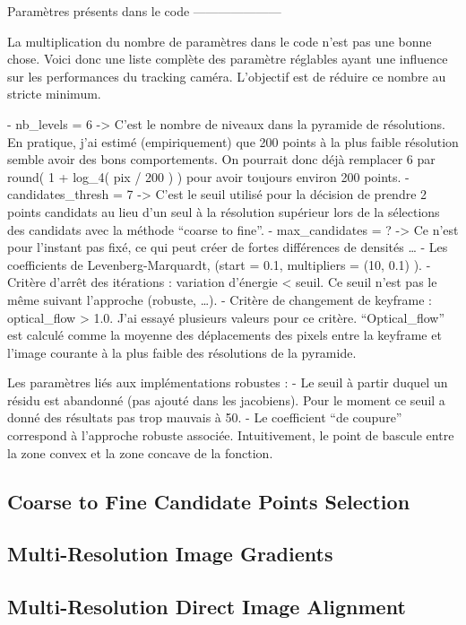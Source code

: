 Paramètres présents dans le code
---------------------

La multiplication du nombre de paramètres dans le code n’est pas une bonne chose. Voici donc une liste complète des paramètre réglables ayant une influence sur les performances du tracking caméra. L’objectif est de réduire ce nombre au stricte minimum.

- nb\_levels = 6 -> C’est le nombre de niveaux dans la pyramide de résolutions. En pratique, j’ai estimé (empiriquement) que 200 points à la plus faible résolution semble avoir des bons comportements. On pourrait donc déjà remplacer 6 par round( 1 + log\_4( pix / 200 ) ) pour avoir toujours environ 200 points.
- candidates\_thresh = 7 -> C’est le seuil utilisé pour la décision de prendre 2 points candidats au lieu d’un seul à la résolution supérieur lors de la sélections des candidats avec la méthode “coarse to fine”.
- max\_candidates = ? -> Ce n’est pour l’instant pas fixé, ce qui peut créer de fortes différences de densités …
- Les coefficients de Levenberg-Marquardt, (start = 0.1, multipliers = (10, 0.1) ).
- Critère d’arrêt des itérations : variation d’énergie < seuil. Ce seuil n’est pas le même suivant l’approche (robuste, …).
- Critère de changement de keyframe : optical\_flow > 1.0. J’ai essayé plusieurs valeurs pour ce critère. “Optical\_flow” est calculé comme la moyenne des déplacements des pixels entre la keyframe et l’image courante à la plus faible des résolutions de la pyramide.

Les paramètres liés aux implémentations robustes :
- Le seuil à partir duquel un résidu est abandonné (pas ajouté dans les jacobiens). Pour le moment ce seuil a donné des résultats pas trop mauvais à 50.
- Le coefficient “de coupure” correspond à l’approche robuste associée. Intuitivement, le point de bascule entre la zone convex et la zone concave de la fonction.

\subsection{Coarse to Fine Candidate Points Selection}%
\label{sub:candidates}

\subsection{Multi-Resolution Image Gradients}%
\label{sub:multires-gradients}

\subsection{Multi-Resolution Direct Image Alignment}%
\label{sub:multires-direct-image-alignment}

